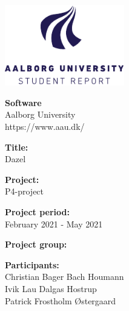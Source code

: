 {}
\thispagestyle{empty}

\begin{singlespace} 
\begin{minipage}[t]{0.48\textwidth}
    \vspace*{-25pt}			%
    \includegraphics[height=3.5cm]{AAUgraphics/aau_logo_en}
    \end{minipage}
    \hfill
    \begin{minipage}[t]{0.48\textwidth} {
        \small 
        \textbf{Software} \\
        Aalborg University \\
        https://www.aau.dk/
    }
\end{minipage}

\vspace*{1cm}

\begin{minipage}[t]{0.48\textwidth}
    \textbf{Title:} \\[5pt]\bigskip\hspace{2ex}
    Dazel
    
    \textbf{Project:} \\[5pt]\bigskip\hspace{2ex}
    P4-project
    
    \textbf{Project period:} \\[5pt]\bigskip\hspace{2ex}
    February 2021 - May 2021
    
    \textbf{Project group:} \\[5pt]\bigskip\hspace{2ex}
    \authorname %
    
    \textbf{Participants:} \\[5pt]\hspace*{2ex}
    Christian Bager Bach Houmann \\\hspace*{2ex}
    Ivik Lau Dalgas Hostrup \\\hspace*{2ex}
    Patrick Frostholm Østergaard \\\hspace*{2ex}
    

\end{minipage}
\end{singlespace}
